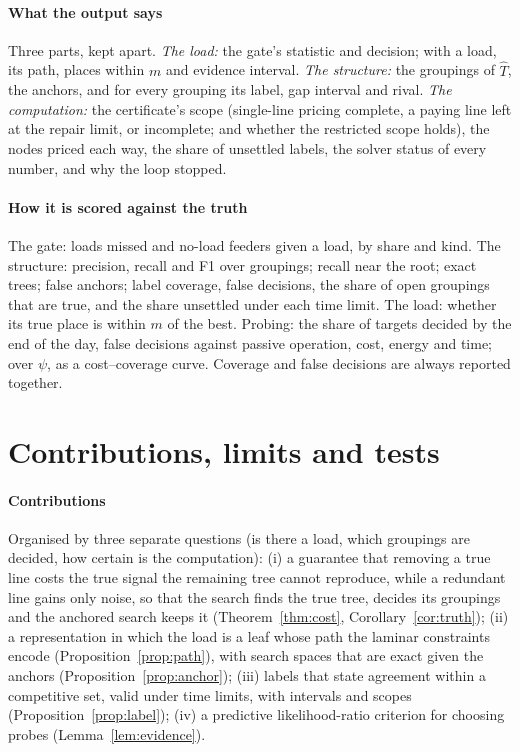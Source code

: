 \documentclass[journal,onecolumn,11pt]{IEEEtran}
\begin{document}
\paragraph*{What the output says} Three parts, kept apart. \emph{The load:} the gate's statistic and decision; with a load,
its path, places within $m$ and evidence interval. \emph{The structure:} the groupings of $\hat T$, the anchors, and for every
grouping its label, gap interval and rival. \emph{The computation:} the certificate's scope (single-line pricing complete, a paying line left at the repair limit, or
incomplete; and whether the restricted scope holds), the nodes priced each way, the
share of unsettled labels, the solver status of every number, and why the loop stopped.

\paragraph*{How it is scored against the truth} The gate: loads missed and no-load feeders given a load, by share and kind.
The structure: precision, recall and F1 over groupings; recall near the root; exact trees; false anchors; label coverage,
false decisions, the share of open groupings that are true, and the share unsettled under each time limit. The load: whether
its true place is within $m$ of the best. Probing: the share of targets decided by the end of the day, false decisions
against passive operation, cost, energy and time; over $\psi$, as a cost--coverage curve. Coverage and false decisions are
always reported together.

\section{Contributions, limits and tests}\label{sec:tests}

\paragraph*{Contributions} Organised by three separate questions (is there a load, which groupings are decided, how
certain is the computation): (i) a guarantee that removing a true line costs the true signal the remaining tree cannot
reproduce, while a redundant line gains only noise, so that the search finds the true tree, decides its groupings and the
anchored search keeps it (Theorem~\ref{thm:cost}, Corollary~\ref{cor:truth}); (ii) a representation in which the load is a
leaf whose path the laminar constraints encode (Proposition~\ref{prop:path}), with search spaces that are exact given the
anchors (Proposition~\ref{prop:anchor}); (iii) labels that state agreement within a competitive set, valid under time
limits, with intervals and scopes (Proposition~\ref{prop:label}); (iv) a predictive likelihood-ratio criterion for choosing
probes (Lemma~\ref{lem:evidence}).
\end{document}
